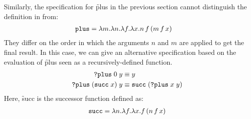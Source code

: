 Similarly, the specification for \f{plus} in the previous
section cannot distinguish the definition in
 from:
%
\begin{align}
  \label{eq:plus-def2}
  \texttt{plus} &= \lambda m.\lambda n.\lambda f.\lambda x.n\,f\,(m\,f\,x)
\end{align}
%
They differ on the order in which the arguments $n$ and $m$
are applied to get the final result.
%
In this case, we can give an alternative specification based
on the evaluation of \f{plus} seen as a recursively-defined
function.
%
\begin{align*}
  \texttt{?plus}\;0\;y &\equiv y \\
  \texttt{?plus}\;(\texttt{succ}\;x)\;y &\equiv \texttt{succ}\;(\texttt{?plus}\;x\;y)
\end{align*}
%
Here, \f{succ} is the successor function defined as:
%
\begin{align*}
  \texttt{succ} = \lambda n. \lambda f. \lambda x. f\,(n\,f\,x)
\end{align*}


